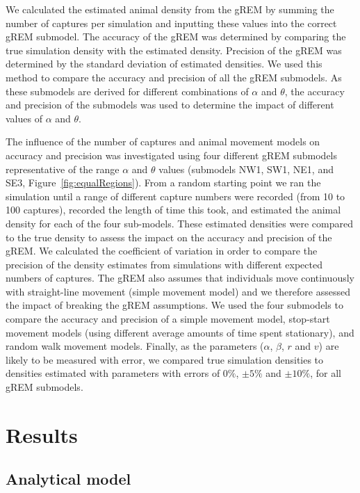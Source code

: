 We calculated the estimated animal density from the gREM by summing the number of captures per simulation and inputting these values into the correct gREM submodel.
The accuracy of the gREM was determined by comparing the true simulation density with the estimated density.
Precision of the gREM was determined by the standard deviation of estimated densities.
We used this method to compare the accuracy and precision of all the gREM submodels.
As these submodels are derived for different combinations of $\alpha$ and $\theta$, the accuracy and precision of the submodels was used to determine the impact of different values of $\alpha$ and $\theta$. 

The influence of the number of captures and animal movement models on accuracy and precision was investigated using four different gREM submodels representative of the range $\alpha$ and $\theta$ values (submodels NW1, SW1, NE1, and SE3, Figure~\ref{fig:equalRegions}).
From a random starting point we ran the simulation until a range of different capture numbers were recorded (from 10 to 100 captures), recorded the length of time this took, and estimated the animal density for each of the four sub-models.
These estimated densities were compared to the true density to assess the impact on the accuracy and precision of the gREM.
We calculated the coefficient of variation in order to compare the precision of the density estimates from simulations with different expected numbers of captures.
The gREM also assumes that individuals move continuously with straight-line movement (simple movement model) and we therefore assessed the impact of breaking the gREM assumptions.
We used the four submodels to compare the accuracy and precision of a simple movement model, stop-start movement models (using different average amounts of time spent stationary), and random walk movement models.
Finally, as the parameters ($\alpha$, $\beta$, $r$ and $v$) are likely to be measured with error, we compared true simulation densities to densities estimated with parameters with errors of $0\%$, $\pm 5\%$ and $\pm 10\%$, for all gREM submodels.


\section{Results}

\subsection{Analytical model}

